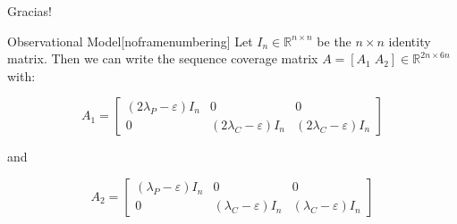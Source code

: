 \documentclass[10pt, t]{beamer}
\begin{document}
\begin{frame}{}
	\begin{center}
		\vspace{30mm}
		\Large	Gracias!
	\end{center}
\end{frame}
\begin{frame}{Observational Model}[noframenumbering]
  Let $I_n \in \mathbb{R}^{n \times n}$ be the $n \times n$ identity matrix. Then we can write the sequence coverage matrix $A = [A_1 \; A_2] \in \mathbb{R}^{2n \times 6n}$ with:
  \renewcommand{\arraystretch}{2}
    \begin{center}
    $$ A_1 = 
    \left[
        \begin{array}{c|c|c}
            (2 \lambda_P - \varepsilon)I_n  & 0 & 0 \\ \hline
            0  & (2 \lambda_C - \varepsilon)I_n &  (2 \lambda_C - \varepsilon)I_n 
        \end{array}
    \right]
    $$
    \end{center}
    and 
    \begin{center}
    $$ A_2 = 
    \left[
        \begin{array}{c|c|c}
            (\lambda_P - \varepsilon)I_n  & 0 & 0 \\ \hline
            0  & (\lambda_C - \varepsilon)I_n &  (\lambda_C- \varepsilon)I_n 
        \end{array}
    \right]
    $$
    \end{center}
    \end{frame}
    
	
\end{document}
